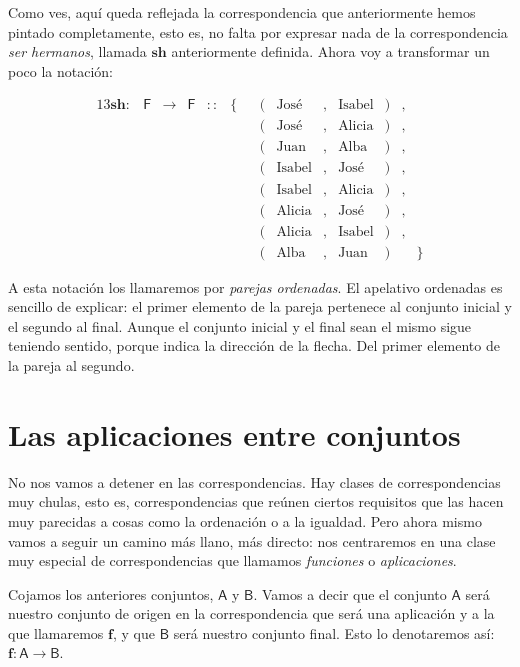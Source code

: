 \documentclass{amsart}
\theoremstyle{definition}
\theoremstyle{remark}
\numberwithin{equation}{section}
\newcommand{\fromto}{\longrightarrow}
\newcommand{\setsymbol}[1]{\textsf{#1}}
\newcommand{\sA}{\setsymbol{A}}
\newcommand{\sB}{\setsymbol{B}}
\newcommand{\sF}{\setsymbol{F}}
\newcommand{\monrel}[1]{\mathbf{#1}}
\newcommand{\funct}[1]{\monrel{#1}}
\begin{document}
    
    Como ves, aquí queda reflejada la correspondencia que anteriormente hemos
    pintado completamente, esto es, no falta por expresar nada de la
    correspondencia \emph{ser hermanos}, llamada $\monrel{sh}$ anteriormente
    definida. Ahora voy a transformar un poco la notación: 
	
    
    \begin{alignat*}{13}
		\monrel{sh} : & \sF & \fromto & \sF & :: & \{ && ( & \text{José}   & 
, & \text{Isabel} & ) & , & \\
		&&&&&&& ( & \text{José}   & , & \text{Alicia} & ) & ,&\\ 
		&&&&&&& ( & \text{Juan}   & , & \text{Alba} & ) & ,  &\\
		&&&&&&& ( & \text{Isabel} & , & \text{José} & ) & ,  &\\
		&&&&&&& ( & \text{Isabel} & , & \text{Alicia} & ) & ,&\\ 
		&&&&&&& ( & \text{Alicia} & , & \text{José} & ) & ,  &\\
		&&&&&&& ( & \text{Alicia} & , & \text{Isabel} & ) & ,&\\
		&&&&&&& ( & \text{Alba}   & , & \text{Juan}  & ) & & \} 
	\end{alignat*}  
	
    
    A esta notación los llamaremos por \emph{parejas ordenadas}. El apelativo 
    ordenadas es sencillo de explicar: el primer elemento de la pareja 
    pertenece al conjunto inicial y el segundo al final. Aunque el conjunto 
    inicial y el final sean el mismo sigue teniendo sentido, porque indica la 
    dirección de la flecha. Del primer elemento de la pareja al segundo.
	
	\section{Las aplicaciones entre conjuntos}
	
	No nos vamos a detener en las correspondencias. Hay clases de 
correspondencias muy chulas, esto es, correspondencias que reúnen ciertos 
requisitos que las hacen muy parecidas a cosas como la ordenación o a la 
igualdad. Pero ahora mismo vamos a seguir un camino más llano, más directo: 
nos centraremos en una clase muy especial de correspondencias que llamamos 
\emph{funciones} o \emph{aplicaciones}. 
	
	Cojamos los anteriores conjuntos, $\sA$ y $\sB$. Vamos a decir que el 
conjunto $\sA$ será nuestro conjunto de origen en la correspondencia que será 
una aplicación y a la que llamaremos $\monrel{f}$, y que $\sB$ será nuestro 
conjunto final. Esto lo denotaremos así: $\funct{f} : \sA \fromto \sB$.
	
\end{document}
